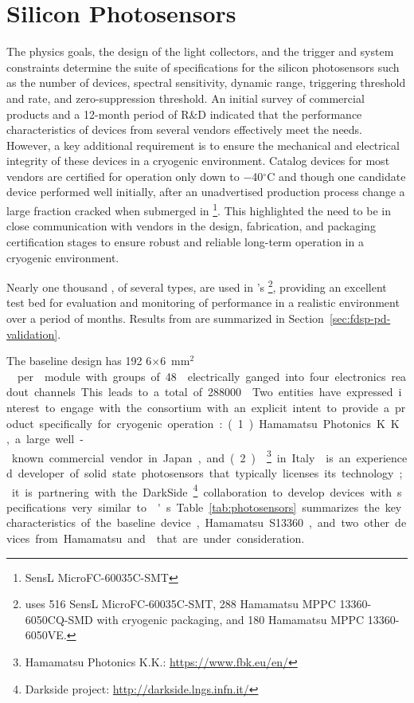 \section{Silicon Photosensors} %
\label{sec:fdsp-pd-ps}

The physics goals, the design of the light collectors, and the trigger and  system constraints determine the suite of specifications for the silicon photosensors such as the number of devices, spectral sensitivity, dynamic range, triggering threshold and rate, and zero-suppression threshold. An initial survey of commercial products and a 12-month period of R\&D indicated that the performance characteristics of devices from several vendors effectively meet the  needs. 
However, a key additional requirement is to ensure the mechanical and electrical integrity of these devices in a cryogenic environment. Catalog devices for most vendors are certified for operation only down to \num{-40}$^\circ$C and though one candidate device performed well initially, after an unadvertised production process change a large fraction cracked when submerged in \footnote{SensL MicroFC-60035C-SMT}. This highlighted the need to be in close communication with vendors in the 
 design, fabrication, and packaging certification stages to ensure 
robust and reliable long-term operation in a cryogenic environment. 

Nearly one thousand , of several types, are used in 's \footnote{ uses 516 SensL MicroFC-60035C-SMT, 288 Hamamatsu MPPC 13360-6050CQ-SMD with cryogenic packaging, and 180 Hamamatsu MPPC 13360-6050VE.}, providing an excellent test bed for evaluation and monitoring of  performance in a realistic environment over a period of months. Results from  are summarized in Section~\ref{sec:fdsp-pd-validation}.

The  baseline  design has \num{192} \num{6}$\times$\SI{6}{mm$^2$}  per  module with groups of \num{48}  electrically ganged into four electronics readout channels. This leads to a total of \num{288000} . %

Two entities have expressed interest to engage with the consortium with an explicit intent to provide a product specifically for cryogenic operation: (1) Hamamatsu Photonics K.K., a large well-known commercial vendor in Japan, and (2) \footnote{Hamamatsu Photonics K.K.: \url{https://www.fbk.eu/en/}}
in Italy. 
 is an experienced developer of solid state photosensors that typically licenses its technology; it is partnering with the DarkSide\footnote{Darkside project: \url{http://darkside.lngs.infn.it/}} collaboration to develop devices with specifications very similar to 's.  Table~\ref{tab:photosensors} summarizes the key characteristics of the baseline device, Hamamatsu S13360, and two other devices from Hamamatsu and  that are under consideration.

